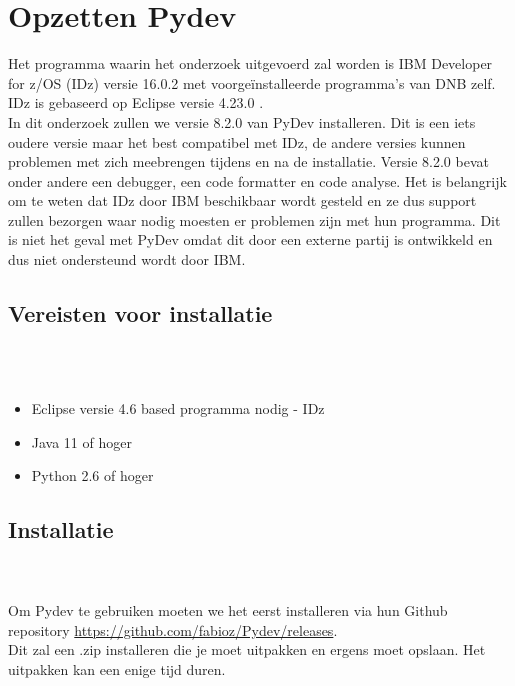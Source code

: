 
\chapter{Opzetten Pydev}
\label{ch:opzetten-pydev}

Het programma waarin het onderzoek uitgevoerd zal worden is IBM Developer for z/OS (IDz) versie 16.0.2 met voorgeïnstalleerde programma's van DNB zelf. IDz is gebaseerd op Eclipse versie 4.23.0 . \\ In dit onderzoek zullen we versie 8.2.0 van PyDev installeren. Dit is een iets oudere versie maar het best compatibel met IDz, de andere versies kunnen problemen met zich meebrengen tijdens en na de installatie.
Versie 8.2.0 bevat onder andere een debugger, een code formatter en code analyse. Het is belangrijk om te weten dat IDz door IBM beschikbaar wordt gesteld en ze dus support zullen bezorgen waar nodig moesten er problemen zijn met hun programma. Dit is niet het geval met PyDev omdat dit door een externe partij is ontwikkeld en dus niet ondersteund wordt door IBM. \\

\section{Vereisten voor installatie} 
\\ \\
\begin{itemize}
    \item Eclipse versie 4.6 based programma nodig - IDz
    \item Java 11 of hoger
    \item Python 2.6 of hoger
\end{itemize}


\section{Installatie} 
\\ \\
Om Pydev te gebruiken moeten we het eerst installeren via hun Github repository \url{https://github.com/fabioz/Pydev/releases}. \\Dit zal een .zip installeren die je moet uitpakken en ergens moet opslaan. Het uitpakken kan een enige tijd duren. \\

